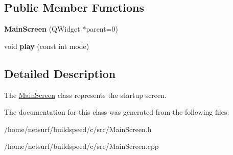 \subsection*{Public Member Functions}
\begin{DoxyCompactItemize}
\item 
{\bfseries Main\+Screen} (Q\+Widget $\ast$parent=0)\hypertarget{class_main_screen_a1d65d91f556ec2d850fa7d5b4f7d2d88}{}\label{class_main_screen_a1d65d91f556ec2d850fa7d5b4f7d2d88}

\item 
void {\bfseries play} (const int mode)\hypertarget{class_main_screen_a9a9d7a411606f74f54767edf79ac2408}{}\label{class_main_screen_a9a9d7a411606f74f54767edf79ac2408}

\end{DoxyCompactItemize}


\subsection{Detailed Description}
The \hyperlink{class_main_screen}{Main\+Screen} class represents the startup screen. 

The documentation for this class was generated from the following files\+:\begin{DoxyCompactItemize}
\item 
/home/netsurf/buildspeed/c/src/Main\+Screen.\+h\item 
/home/netsurf/buildspeed/c/src/Main\+Screen.\+cpp\end{DoxyCompactItemize}
